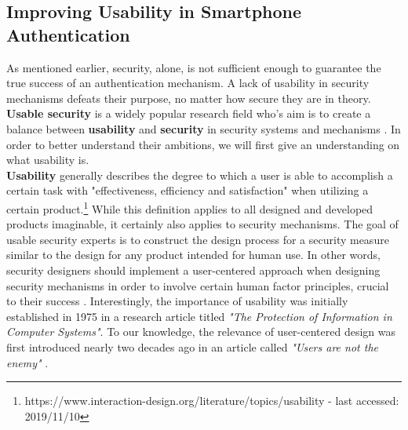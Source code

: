 \subsection{Improving Usability in Smartphone Authentication}

As mentioned earlier, security, alone, is not sufficient enough to guarantee the true success of an authentication mechanism. A lack of usability in security mechanisms defeats their purpose, no matter how secure they are in theory. \textbf{Usable security} is a widely popular research field who's aim is to create a balance between \textbf{usability} and \textbf{security} in security systems and mechanisms \cite{Realpe-Munoz}. In order to better understand their ambitions, we will first give an understanding on what usability is. \\

\textbf{Usability} generally describes the degree to which a user is able to accomplish a certain task with "effectiveness, efficiency and satisfaction" when utilizing a certain product.\footnote{https://www.interaction-design.org/literature/topics/usability - last accessed: 2019/11/10} While this definition applies to all designed and developed products imaginable, it certainly also applies to security mechanisms. The goal of usable security experts is to construct the design process for a security measure similar to the design for any product intended for human use. In other words, security designers should implement a user-centered approach when designing security mechanisms in order to involve certain human factor principles, crucial to their success \cite{Adams:1999:UE:322796.322806, sasse}. Interestingly, the importance of usability was initially established in 1975 in a research article titled \textit{"The Protection of Information in Computer Systems"}. To our knowledge, the relevance of user-centered design was first introduced nearly two decades ago in an article called \textit{"Users are not the enemy"} \cite{Adams:1999:UE:322796.322806}. \\

